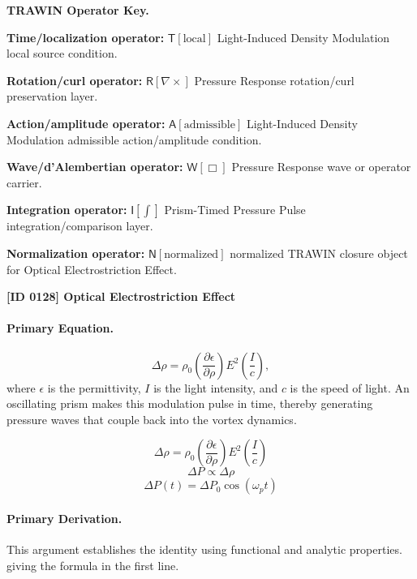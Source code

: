 \par\vspace{0.45\baselineskip}
\noindent\begin{minipage}[t]{\linewidth}
\begingroup
\small
\raggedright
\textbf{TRAWIN Operator Key.}\par
\noindent\textbf{Time/localization operator:} $\mathsf{T}\!\left[\mathrm{local}\right]$ Light-Induced Density Modulation local source condition.\par
\noindent\textbf{Rotation/curl operator:} $\mathsf{R}\!\left[\nabla\times\right]$ Pressure Response rotation/curl preservation layer.\par
\noindent\textbf{Action/amplitude operator:} $\mathsf{A}\!\left[\mathrm{admissible}\right]$ Light-Induced Density Modulation admissible action/amplitude condition.\par
\noindent\textbf{Wave/d'Alembertian operator:} $\mathsf{W}\!\left[\Box\right]$ Pressure Response wave or operator carrier.\par
\noindent\textbf{Integration operator:} $\mathsf{I}\!\left[\int\right]$ Prism-Timed Pressure Pulse integration/comparison layer.\par
\noindent\textbf{Normalization operator:} $\mathsf{N}\!\left[\mathrm{normalized}\right]$ normalized TRAWIN closure object for Optical Electrostriction Effect.\par
\endgroup
\end{minipage}

\clearpage
\noindent\textbf{[ID 0128] Optical Electrostriction Effect}\par
\vspace{0.35em}
\paragraph{Primary Equation.}
\[ \Delta \rho = \rho_0 \left(\frac{\partial \epsilon}{\partial \rho}\right) E^2 \left(\frac{I}{c}\right), \] where $\epsilon$ is the permittivity, $I$ is the light intensity, and $c$ is the speed of light. An oscillating prism makes this modulation pulse in time, thereby generating pressure waves that couple back into the vortex dynamics.

\[
\Delta \rho = \rho_0\left(\frac{\partial \epsilon}{\partial \rho}\right)E^2\left(\frac{I}{c}\right)
\]
\[
\Delta P \propto \Delta \rho
\]
\[
\Delta P(t) = \Delta P_0\cos(\omega_p t)
\]

\paragraph{Primary Derivation.}
This argument establishes the identity using functional and analytic properties. giving the formula in the first line.
